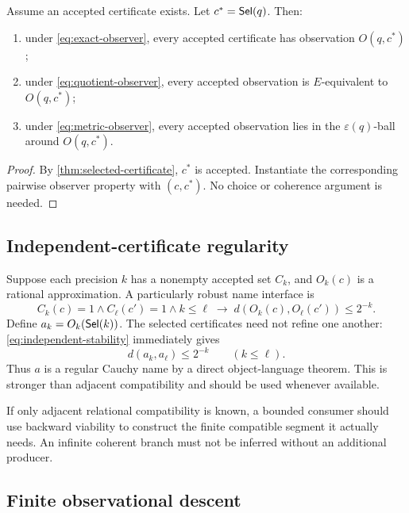 \begin{theorem}
\label{thm:choice-erasure}
Assume an accepted certificate exists.  Let \(c^*=\mathsf{Sel}(q)\).  Then:
\begin{enumerate}[label=(\roman*),leftmargin=2.3em]
\item under \eqref{eq:exact-observer}, every accepted certificate has observation \(O(q,c^*)\);
\item under \eqref{eq:quotient-observer}, every accepted observation is \(E\)-equivalent to \(O(q,c^*)\);
\item under \eqref{eq:metric-observer}, every accepted observation lies in the \(\varepsilon(q)\)-ball around \(O(q,c^*)\).
\end{enumerate}
\end{theorem}

\begin{proof}
By \cref{thm:selected-certificate}, \(c^*\) is accepted.  Instantiate the corresponding pairwise observer property with \((c,c^*)\).  No choice or coherence argument is needed.
\end{proof}

\subsection{Independent-certificate regularity}

Suppose each precision \(k\) has a nonempty accepted set \(C_k\), and \(O_k(c)\) is a rational approximation.  A particularly robust name interface is
\begin{equation}
 C_k(c)=1\wedge C_\ell(c')=1\wedge k\leq\ell
 \;\to\;
 d(O_k(c),O_\ell(c'))\leq 2^{-k}.
 \label{eq:independent-stability}
\end{equation}
Define \(a_k=O_k(\mathsf{Sel}(k))\).  The selected certificates need not refine one another: \eqref{eq:independent-stability} immediately gives
\[
 d(a_k,a_\ell)\leq2^{-k}\qquad(k\leq\ell).
\]
Thus \(a\) is a regular Cauchy name by a direct object-language theorem.  This is stronger than adjacent compatibility and should be used whenever available.

If only adjacent relational compatibility is known, a bounded consumer should use backward viability to construct the finite compatible segment it actually needs.  An infinite coherent branch must not be inferred without an additional producer.

\subsection{Finite observational descent}


